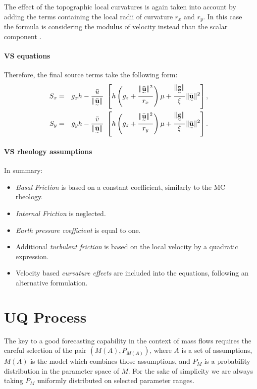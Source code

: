 \documentclass{article}
\begin{document}
The effect of the topographic local curvatures is again taken into account by adding the terms containing the local radii of curvature $r_x$ and $r_y$. In this case the formula is considering the modulus of velocity instead than the scalar component \citep{Fischer2012}.

\paragraph{VS equations} Therefore, the final source terms take the following form:
\begin{eqnarray}
\label{eq:S_terms_VS}
S_{x} &=&  g_{x} h - \frac{\bar{u}}{\| \underset{^\sim}{\bar{\textbf u}}\|} \ \left[ h \left(g_{z} + \frac{\| \underset{^\sim}{\bar{\textbf u}} \|^2}{r_{x}} \right)\mu+ \frac{\| \underset{^\sim}{\textbf g} \|}{\xi}\| \underset{^\sim}{\bar{\textbf u}} \|^2\right], \nonumber \\
S_{y} &=& g_{y} h - \frac{\bar{v}}{\| \underset{^\sim}{\bar{\textbf u}}\|} \ \left[ h \left(g_{z} + \frac{\| \underset{^\sim}{\bar{\textbf u}} \|^2}{r_{y}} \right)\mu+ \frac{\| \underset{^\sim}{\textbf g} \|}{\xi}\| \underset{^\sim}{\bar{\textbf u}} \|^2\right].
\end{eqnarray}

\paragraph{VS rheology assumptions} In summary:
\begin{itemize}
\item \textit{Basal Friction} is based on a constant coefficient, similarly to the MC rheology.

\item \textit{Internal Friction} is neglected.

\item \textit{Earth pressure coefficient} is equal to one.

\item Additional \textit{turbulent friction} is based on the local velocity by a quadratic expression.

\item Velocity based \textit{curvature effects} are included into the equations, following an alternative formulation.
\end{itemize}

\section{UQ Process}
The key to a good forecasting capability in the context of mass flows requires the careful selection of the pair $\left(M(A), P_{M(A)}\right)$, where $A$ is a set of assumptions, $M(A)$ is the model which combines those assumptions, and $P_M$ is a probability distribution in the parameter space of $M$. For the sake of simplicity we are always taking $P_M$ uniformly distributed on selected parameter ranges.
\end{document}
